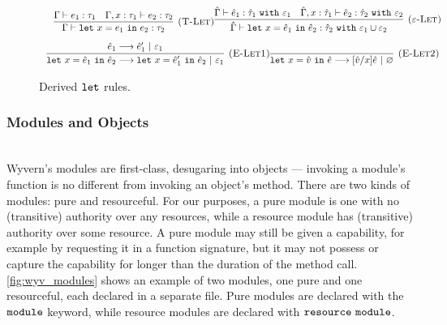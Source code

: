 \begin{figure}[h]


\[
\begin{array}{c}

	~~~
	
	\infer[\textsc{(T-Let)}]
	{\Gamma \vdash \letxpr{x}{e_1}{e_2}: \tau_2}
	{\Gamma \vdash e_1: \tau_1 & \Gamma, x: \tau_1 \vdash e_2: \tau_2}

\infer[\textsc{($\varepsilon$-Let)}]
	{\hat \Gamma \vdash \letxpr{x}{\hat e_1}{\hat e_2} : \hat \tau_2~\kw{with} \varepsilon_1 \cup \varepsilon_2}
	{\hat \Gamma \vdash \hat e_1 : \hat \tau_1~\kw{with} \varepsilon_1 & \hat \Gamma, x: \hat \tau_1 \vdash \hat e_2: \hat \tau_2~\kw{with} \varepsilon_2} \\[2ex]
	
\infer[\textsc{(E-Let1)}]
	{\letxpr{x}{\hat e_1}{\hat e_2} \longrightarrow \letxpr{x}{\hat e_1'}{\hat e_2}~|~\varepsilon_1}
	{\hat e_1 \longrightarrow \hat e_1'~|~\varepsilon_1} 
	
\infer[\textsc{(E-Let2)}]
	{\letxpr{x}{\hat v}{\hat e} \longrightarrow [\hat v/x]\hat e~|~\varnothing}
	{} 

\end{array}
\]

\caption{Derived $\mathtt{let}$ rules.}
\label{fig:let_rules}
\end{figure}


\subsubsection{Modules and Objects}~\\

Wyvern's modules are first-class, desugaring into objects --- invoking a module's function is no different from invoking an object's method. There are two kinds of modules: pure and resourceful. For our purposes, a pure module is one with no (transitive) authority over any resources, while a resource module has (transitive) authority over some resource. A pure module may still be given a capability, for example by requesting it in a function signature, but it may not possess or capture the capability for longer than the duration of the method call. \ref{fig:wyv_modules} shows an example of two modules, one pure and one resourceful, each declared in a separate file. Pure modules are declared with the $\mathtt{module}$ keyword, while resource modules are declared with $\mathtt{resource~module}$.

